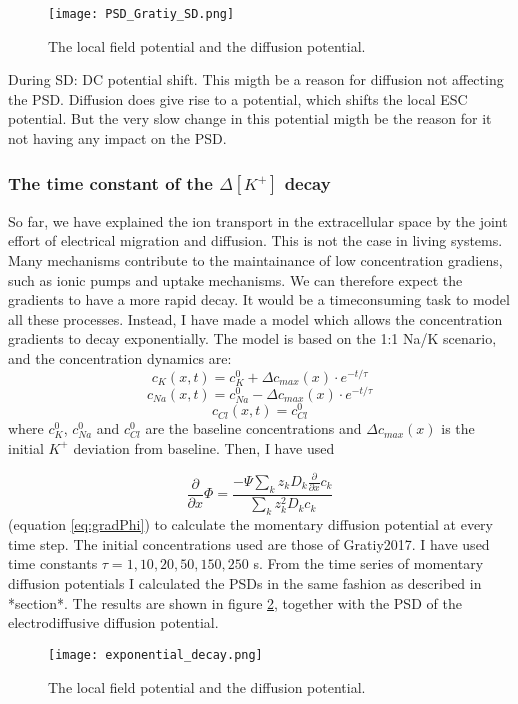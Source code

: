 \documentclass{article}
\begin{document}
\begin{figure}
  \texttt{[image: PSD\_Gratiy\_SD.png]}
  \caption{The local field potential and the diffusion potential. }
  \label{fig:PSD_Gratiy_SD}
\end{figure}

During SD: DC potential shift. This migth be a reason for diffusion not affecting the PSD. Diffusion does give rise to a potential, which shifts the local ESC potential. But the very slow change in this potential migth be the reason for it not having any impact on the PSD.

\subsubsection{The time constant of the  $\Delta [K^+]$ decay}
So far, we have explained the ion transport in the extracellular space by the joint effort of electrical migration and diffusion. This is not the case in living systems. Many mechanisms contribute to the maintainance of low concentration gradiens, such as ionic pumps and uptake mechanisms. We can therefore expect the gradients to have a more rapid decay. It would be a timeconsuming task to model all these processes. Instead, I have made a model which allows the concentration gradients to decay exponentially. The model is based on the 1:1 Na/K scenario, and the concentration dynamics are:
$$
c_{K}(x,t) = c_{K}^0 +\Delta c_{max}(x) \cdot e^{-t/\tau}
$$
$$
c_{Na}(x,t) = c_{Na}^0 -\Delta c_{max}(x) \cdot e^{-t/\tau}
$$
$$
c_{Cl}(x,t) = c_{Cl}^0
$$
where $c_{K}^0$, $c_{Na}^0$ and $c_{Cl}^0$ are the baseline concentrations and $\Delta c_{max} (x)$ is the initial $K^+$ deviation from baseline.  Then, I have used 


\begin{equation*}
\frac{\partial}{\partial x} \Phi = \frac{-\Psi \sum_k z_k D_k \frac{\partial}{\partial x} c_k}{\sum_k z_k^2 D_k c_k}
\end{equation*}
(equation \ref{eq:gradPhi}) to calculate the momentary diffusion potential at every time step. The initial concentrations used are those of Gratiy2017. I have used time constants $\tau = 1,10,20,50, 150, 250$ s. From the time series of momentary diffusion potentials I calculated the PSDs in the same fashion as described in *section*. The results are shown in figure \ref{fig:exponential_decay}, together with the PSD of the electrodiffusive diffusion potential. 

\begin{figure}
  \texttt{[image: exponential\_decay.png]}
  \caption{The local field potential and the diffusion potential. }
  \label{fig:exponential_decay}
\end{figure}
\end{document}
